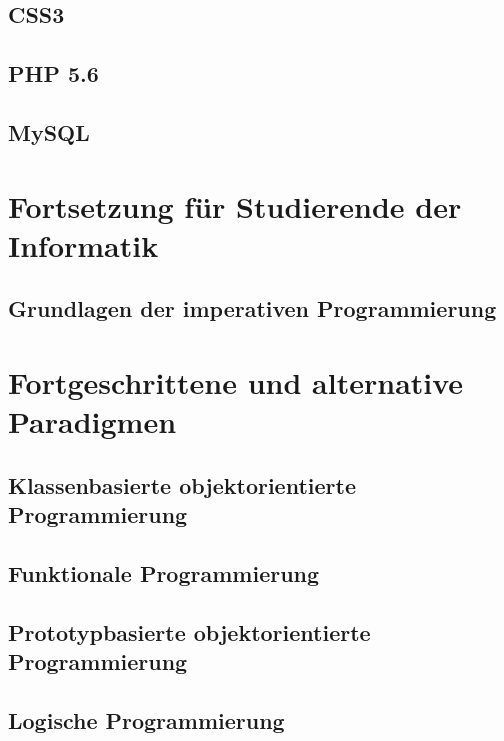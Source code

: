 \documentclass[11pt, a4paper, oneside, draft]{book}
\begin{document}
\chapter{CSS3}
%
\chapter{PHP 5.6}
%
\chapter{MySQL}

\part{Fortsetzung für Studierende der Informatik}
%
\chapter{Grundlagen der imperativen Programmierung}

\part{Fortgeschrittene und alternative Paradigmen}

\chapter{Klassenbasierte objektorientierte Programmierung}
%

%

\chapter{Funktionale Programmierung}

\chapter{Prototypbasierte objektorientierte Programmierung}
%

\chapter{Logische Programmierung}
\end{document}
